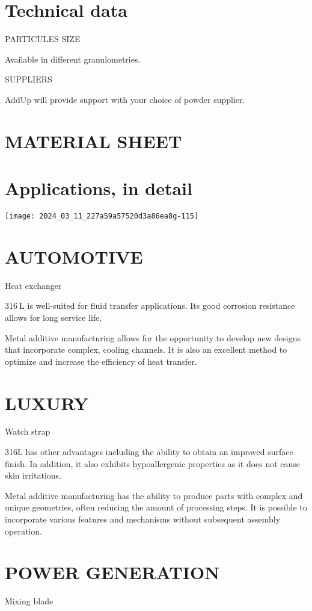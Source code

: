 \documentclass[10pt]{article}
\begin{document}
\section*{Technical data}
PARTICULES SIZE

Available in different granulometries.

SUPPLIERS

AddUp will provide support with your choice of powder supplier.

\section*{MATERIAL SHEET}
\section*{Applications, in detail}
\begin{center}
\texttt{[image: 2024\_03\_11\_227a59a57520d3a86ea8g-115]}
\end{center}

\section*{AUTOMOTIVE}
Heat exchanger

$316 \mathrm{~L}$ is well-suited for fluid transfer applications. Its good corrosion resistance allows for long service life.

Metal additive manufacturing allows for the opportunity to develop new designs that incorporate complex, cooling channels. It is also an excellent method to optimize and increase the efficiency of heat transfer.

\section*{LUXURY}
Watch strap

316L has other advantages including the ability to obtain an improved surface finish. In addition, it also exhibits hypoallergenic properties as it does not cause skin irritations.

Metal additive manufacturing has the ability to produce parts with complex and unique geometries, often reducing the amount of processing steps. It is possible to incorporate various features and mechanisms without subsequent assembly operation.

\section*{POWER GENERATION}
Mixing blade
\end{document}
